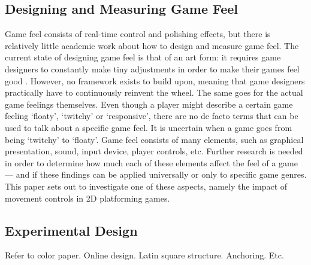 \subsection{Designing and Measuring Game Feel}
Game feel consists of real-time control and polishing effects, but there is relatively little academic work about how to design and measure game feel. The current state of designing game feel is that of an art form: it requires game designers to constantly make tiny adjustments in order to make their games feel good \cite{meatboy1, meatboy2, juicyBeast, gameFeelTips}. However, no framework exists to build upon, meaning that game designers practically have to continuously reinvent the wheel. The same goes for the actual game feelings themselves. Even though a player might describe a certain game feeling `floaty', `twitchy' or `responsive', there are no de facto terms that can be used to talk about a specific game feel. It is uncertain when a game goes from being `twitchy' to `floaty'. Game feel consists of many elements, such as graphical presentation, sound, input device, player controls, etc. Further research is needed in order to determine how much each of these elements affect the feel of a game --- and if these findings can be applied universally or only to specific game genres. This paper sets out to investigate one of these aspects, namely the impact of movement controls in 2D platforming games.

\subsection{Experimental Design}
Refer to color paper. Online design. Latin square structure. Anchoring. Etc.

